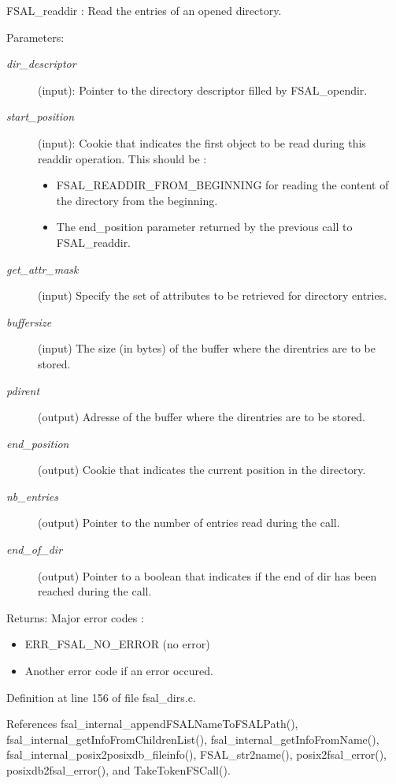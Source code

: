 FSAL\_\-readdir : Read the entries of an opened directory.

\begin{Desc}
\item[Parameters:]
\begin{description}
\item[{\em dir\_\-descriptor}](input): Pointer to the directory descriptor filled by FSAL\_\-opendir. \item[{\em start\_\-position}](input): Cookie that indicates the first object to be read during this readdir operation. This should be :\begin{itemize}
\item FSAL\_\-READDIR\_\-FROM\_\-BEGINNING for reading the content of the directory from the beginning.\item The end\_\-position parameter returned by the previous call to FSAL\_\-readdir. \end{itemize}
\item[{\em get\_\-attr\_\-mask}](input) Specify the set of attributes to be retrieved for directory entries. \item[{\em buffersize}](input) The size (in bytes) of the buffer where the direntries are to be stored. \item[{\em pdirent}](output) Adresse of the buffer where the direntries are to be stored. \item[{\em end\_\-position}](output) Cookie that indicates the current position in the directory. \item[{\em nb\_\-entries}](output) Pointer to the number of entries read during the call. \item[{\em end\_\-of\_\-dir}](output) Pointer to a boolean that indicates if the end of dir has been reached during the call.\end{description}
\end{Desc}
\begin{Desc}
\item[Returns:]Major error codes :\begin{itemize}
\item ERR\_\-FSAL\_\-NO\_\-ERROR (no error)\item Another error code if an error occured. \end{itemize}
\end{Desc}


Definition at line 156 of file fsal\_\-dirs.c.

References fsal\_\-internal\_\-appendFSALNameToFSALPath(), fsal\_\-internal\_\-getInfoFromChildrenList(), fsal\_\-internal\_\-getInfoFromName(), fsal\_\-internal\_\-posix2posixdb\_\-fileinfo(), FSAL\_\-str2name(), posix2fsal\_\-error(), posixdb2fsal\_\-error(), and TakeTokenFSCall().